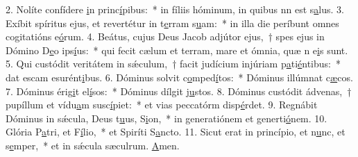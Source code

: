 2. Nolíte confídere \uline{i}n princ\uline{í}pibus:~* in fíliis hóminum, in quibus nn est s\uline{a}lus.
3. Exíbit spíritus ejus, et revertétur in t\uline{e}rram s\uline{u}am:~* in illa die períbunt omnes cogitatións e\uline{ó}rum.
4. Beátus, cujus Deus Jacob adjútor ejus,~† spes ejus in Dómino D\uline{e}o ips\uline{í}us:~* qui fecit cælum et terram, mare et ómnia, quæ n e\uline{i}s sunt.
5. Qui custódit veritátem in sǽculum,~† facit judícium injúriam p\uline{a}ti\uline{é}ntibus:~* dat escam esurént\uline{i}bus.
6. Dóminus solvit c\uline{o}mped\uline{í}tos:~* Dóminus illúmnat c\uline{æ}cos.
7. Dóminus érig\uline{i}t el\uline{í}sos:~* Dóminus dílgit j\uline{u}stos.
8. Dóminus custódit ádvenas,~† pupíllum et vídu\uline{a}m susc\uline{í}piet:~* et vias peccatórm disp\uline{é}rdet.
9. Regnábit Dóminus in sǽcula, Deus t\uline{u}us, S\uline{i}on,~* in generatiónem et generti\uline{ó}nem.
10. Glória P\uline{a}tri, et F\uline{í}lio,~* et Spiríti S\uline{a}ncto.
11. Sicut erat in princípio, et n\uline{u}nc, et s\uline{e}mper,~* et in sǽcula sæculrum. \uline{A}men.
